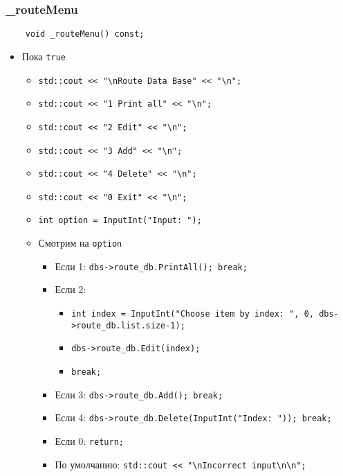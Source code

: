 \subsubsection{\_routeMenu}

\begin{lstlisting}
    void _routeMenu() const;
\end{lstlisting}

\begin{itemize}
    \item Пока \verb|true|
    \begin{itemize}
        \item \verb|std::cout << "\nRoute Data Base" << "\n";|
        \item \verb|std::cout << "1 Print all" << "\n";|
        \item \verb|std::cout << "2 Edit" << "\n";|
        \item \verb|std::cout << "3 Add" << "\n";|
        \item \verb|std::cout << "4 Delete" << "\n";|
        \item \verb|std::cout << "0 Exit" << "\n";|
        \item \verb|int option = InputInt("Input: ");|
        \item Смотрим на \verb|option|
        \begin{itemize}
            \item Если 1: \verb|dbs->route_db.PrintAll(); break;|
            \item Если 2: 
            \begin{itemize}
                \item \verb|int index = InputInt("Choose item by index: ", 0, dbs->route_db.list.size-1);|
                \item \verb|dbs->route_db.Edit(index);|
                \item \verb|break;|
            \end{itemize}
            \item Если 3: \verb|dbs->route_db.Add(); break;|
            \item Если 4: \verb|dbs->route_db.Delete(InputInt("Index: ")); break;|
            \item Если 0: \verb|return;|
            \item По умолчанию: \verb|std::cout << "\nIncorrect input\n\n";|
        \end{itemize}
    \end{itemize}
\end{itemize}

